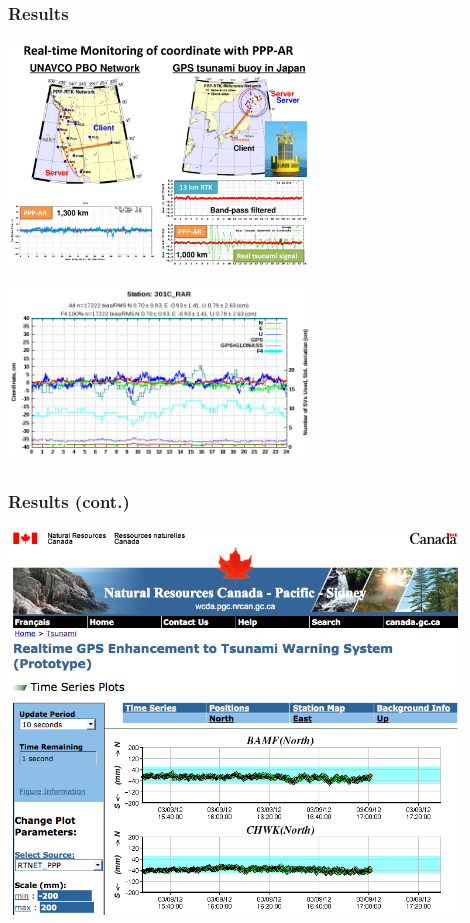 \documentclass[10pt]{beamer}
\begin{document}

\begin{frame}
  \frametitle{Results}
    \includegraphics[width=0.6\textwidth]{tsunami.pdf}

\vspace*{-5mm}
\hspace*{4cm}
    \includegraphics[width=0.6\textwidth]{301C_RAR_POS_2014-01-22.png}
\end{frame}


\begin{frame}
  \frametitle{Results (cont.)}
  \begin{center}
    \includegraphics[width=0.9\textwidth]{nrcan.png}
  \end{center}
\end{frame}
\end{document}
